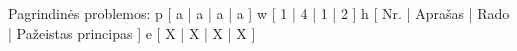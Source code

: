 Pagrindinės problemos:
\xtableu
{
  p [ a | a | a | a ]
  w [ 1 | 4 | 1 | 2 ]
  h [ Nr. | Aprašas | Rado | Pažeistas principas ]
  e [ X | X | X | X ]
}